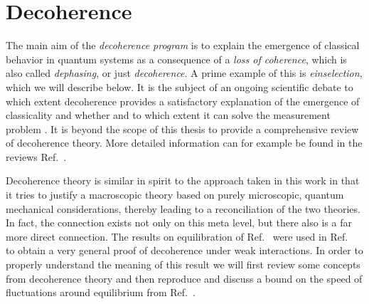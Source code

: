 \documentclass[a4paper,12pt,listof=totoc,index=totoc,bibliography=totoc,headsepline=false,headings=normal,BCOR16.153846mm,DIV12,headinclude,twoside,cleardoublepage=empty,numbers=noenddot,final]{scrreprt}
\theoremstyle{mystyle}
\numberwithin{equation}{section}
\numberwithin{figure}{section}
\numberwithin{lemma}{section}
\numberwithin{theorem}{section}
\numberwithin{corollary}{section}
\numberwithin{definition}{section}
\numberwithin{conjecture}{section}
\numberwithin{observation}{section}
\newcommand{\+}{\mkern2mu}
\DeclareMathOperator{\1}{\mathds{1}}
\begin{document}
\section{Decoherence}
\label{sec:decoherence}
%
The main aim of the \emph{decoherence program} is to explain the emergence of classical behavior in quantum systems as a consequence of a \emph{loss of coherence}, which is also called \emph{dephasing}, or just \emph{decoherence}.
A prime example of this is \emph{einselection}, which we will describe below. 
It is the subject of an ongoing scientific debate to which extent decoherence provides a satisfactory explanation of the emergence of classicality and whether and to which extent it can solve the measurement problem \cite{Schlosshauer2005,0112095v3,0908.4069v1}.
It is beyond the scope of this thesis to provide a comprehensive review of decoherence theory.
More detailed information can for example be found in the reviews Ref.~\cite{RevModPhys.75.715,Schlosshauer2005}.

Decoherence theory is similar in spirit to the approach taken in this work in that it tries to justify a macroscopic theory based on purely microscopic, quantum mechanical considerations, thereby leading to a reconciliation of the two theories. 
In fact, the connection exists not only on this meta level, but there also is a far more direct connection.
The results on equilibration of Ref.~\cite{Linden10} were used in Ref.~\cite{PhysRevE.81.05-1} to obtain a very general proof of decoherence under weak interactions.
In order to properly understand the meaning of this result we will first review some concepts from decoherence theory and then reproduce and discuss a bound on the speed of fluctuations around equilibrium from Ref.~\cite{Linden10}.
\end{document}
